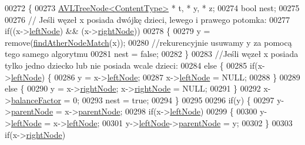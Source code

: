 \begin{DoxyCode}
00272     \{
00273       \hyperlink{class_a_v_l_tree_node}{AVLTreeNode<ContentType>} * t, * y, * z;
00274       \textcolor{keywordtype}{bool} nest;
00275 
00276       \textcolor{comment}{// Jeśli węzeł x posiada dwójkę dzieci, lewego i prawego potomka:}
00277       \textcolor{keywordflow}{if}((x->\hyperlink{class_a_v_l_tree_node_afc53d4774f375c23795c9eb598f4d7cd}{leftNode}) && (x->\hyperlink{class_a_v_l_tree_node_a51dfb148f27625c89a3a153760517c38}{rightNode}))
00278       \{
00279         y = \textcolor{keyword}{remove}(\hyperlink{class_a_v_l_tree_aa776fe15518d516032ca6d4522d77b02}{findAtherNodeMatch}(x));
00280         \textcolor{comment}{//rekurencyjnie usuwamy y za pomocą tego samego algorytmu}
00281         nest = \textcolor{keyword}{false};
00282       \}
00283       \textcolor{comment}{//Jeśli węzeł x posiada tylko jedno dziecko lub nie posiada wcale dzieci:}
00284       \textcolor{keywordflow}{else}  \{
00285         \textcolor{keywordflow}{if}(x->\hyperlink{class_a_v_l_tree_node_afc53d4774f375c23795c9eb598f4d7cd}{leftNode}) \{
00286           y = x->\hyperlink{class_a_v_l_tree_node_afc53d4774f375c23795c9eb598f4d7cd}{leftNode};
00287           x->\hyperlink{class_a_v_l_tree_node_afc53d4774f375c23795c9eb598f4d7cd}{leftNode} = NULL;
00288         \}
00289         \textcolor{keywordflow}{else} \{
00290           y = x->\hyperlink{class_a_v_l_tree_node_a51dfb148f27625c89a3a153760517c38}{rightNode}; x->\hyperlink{class_a_v_l_tree_node_a51dfb148f27625c89a3a153760517c38}{rightNode} = NULL;
00291         \}
00292         x->\hyperlink{class_a_v_l_tree_node_a212c57dab467b42c3ddc50b2aecc05ad}{balanceFactor} = 0;
00293         nest = \textcolor{keyword}{true};
00294       \}
00295 
00296       \textcolor{keywordflow}{if}(y)  \{
00297         y->\hyperlink{class_a_v_l_tree_node_ae64d1261fea217d3e85928e7cf2a9151}{parentNode} = x->\hyperlink{class_a_v_l_tree_node_ae64d1261fea217d3e85928e7cf2a9151}{parentNode};
00298         \textcolor{keywordflow}{if}(x->\hyperlink{class_a_v_l_tree_node_afc53d4774f375c23795c9eb598f4d7cd}{leftNode})
00299                 \{
00300                         y->\hyperlink{class_a_v_l_tree_node_afc53d4774f375c23795c9eb598f4d7cd}{leftNode}  = x->\hyperlink{class_a_v_l_tree_node_afc53d4774f375c23795c9eb598f4d7cd}{leftNode};
00301                         y->\hyperlink{class_a_v_l_tree_node_afc53d4774f375c23795c9eb598f4d7cd}{leftNode}->\hyperlink{class_a_v_l_tree_node_ae64d1261fea217d3e85928e7cf2a9151}{parentNode}  = y;
00302                 \}
00303         \textcolor{keywordflow}{if}(x->\hyperlink{class_a_v_l_tree_node_a51dfb148f27625c89a3a153760517c38}{rightNode})

\end{DoxyCode}
